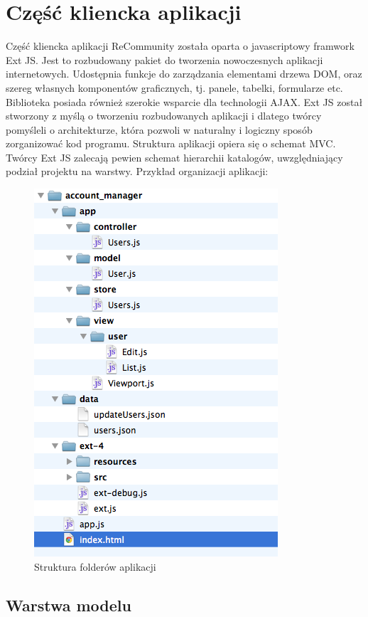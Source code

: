 \chapter{Część kliencka aplikacji}

Część kliencka aplikacji ReCommunity została oparta o javascriptowy framwork Ext JS. Jest to rozbudowany pakiet do tworzenia nowoczesnych aplikacji internetowych. Udostępnia funkcje do zarządzania elementami drzewa DOM, oraz szereg własnych komponentów graficznych, tj. panele, tabelki, formularze etc. Biblioteka posiada również szerokie wsparcie dla technologii AJAX. Ext JS został stworzony z myślą o tworzeniu rozbudowanych aplikacji i dlatego twórcy pomyśleli o architekturze, która pozwoli w naturalny i logiczny sposób zorganizować kod programu. Struktura aplikacji opiera się o schemat MVC. Twórcy Ext JS zalecają pewien schemat hierarchii katalogów, uwzględniający podział projektu na warstwy. Przykład organizacji aplikacji:

\begin{figure}[H]
	\centering
	\includegraphics[scale=0.5]{images/struktura_folderow.png}
	\caption{Struktura folderów aplikacji}
\end{figure}

\section{Warstwa modelu}

